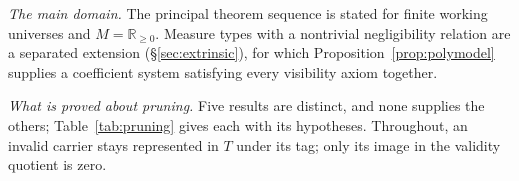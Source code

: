 
\textit{The main domain.} The principal theorem sequence is stated for finite working universes and $M = \mathbb{R}_{\ge 0}$. Measure types with a nontrivial negligibility relation are a separated extension (\S\ref{sec:extrinsic}), for which Proposition~\ref{prop:polymodel} supplies a coefficient system satisfying every visibility axiom together.

\textit{What is proved about pruning.} Five results are distinct, and none supplies the others; Table~\ref{tab:pruning} gives each with its hypotheses. Throughout, an invalid carrier stays represented in $T$ under its tag; only its image in the validity quotient is zero.


